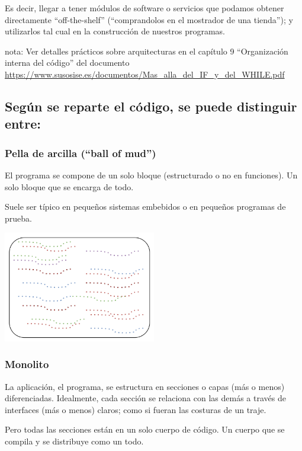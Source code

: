 \documentclass[spanish,12pt,a4paper,final,oneside]{book}
\begin{document}
Es decir, llegar a tener módulos de software o servicios que podamos obtener directamente ``off-the-shelf'' (``comprandolos en el mostrador de una tienda''); y utilizarlos tal cual en la construcción de nuestros programas.

nota: Ver detalles prácticos sobre arquitecturas en el capítulo 9 ``Organización interna del código'' del documento \url{https://www.susosise.es/documentos/Mas_alla_del_IF_y_del_WHILE.pdf}


\subsection{Según se reparte el código, se puede distinguir entre:}


\subsubsection{Pella de arcilla (``ball of mud'')}
El programa se compone de un solo bloque (estructurado o no en funciones). Un solo bloque que se encarga de todo.

Suele ser típico en pequeños sistemas embebidos o en pequeños programas de prueba.

\begin{center}
\includegraphics[width=0.5\textwidth]{arquitectura - ball of mud}
\end{center}

\subsubsection{Monolito}

La aplicación, el programa, se estructura en secciones o capas (más o menos) diferenciadas. Idealmente, cada sección se relaciona con las demás a través de interfaces (más o menos) claros; como si fueran las costuras de un traje.

Pero todas las secciones están en un solo cuerpo de código. Un cuerpo que se compila y se distribuye como un todo. 
\end{document}
